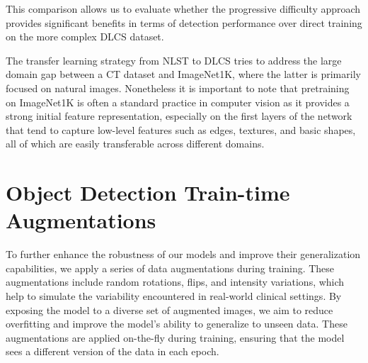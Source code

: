 This comparison allows us to evaluate whether the progressive difficulty approach provides significant benefits in terms of detection performance over direct training on the more complex DLCS dataset. 

The transfer learning strategy from NLST to DLCS tries to address the large domain gap between a CT dataset and ImageNet1K, where the latter is primarily focused on natural images. Nonetheless it is important to note that pretraining on ImageNet1K is often a standard practice in computer vision as it provides a strong initial feature representation, especially on the first layers of the network that tend to capture low-level features such as edges, textures, and basic shapes, all of which are easily transferable across different domains.


\section{Object Detection Train-time Augmentations}
\label{sec:augmentation}
To further enhance the robustness of our models and improve their generalization capabilities, we apply a series of data augmentations during training. These augmentations include random rotations, flips, and intensity variations, which help to simulate the variability encountered in real-world clinical settings. By exposing the model to a diverse set of augmented images, we aim to reduce overfitting and improve the model's ability to generalize to unseen data. These augmentations are applied on-the-fly during training, ensuring that the model sees a different version of the data in each epoch.

